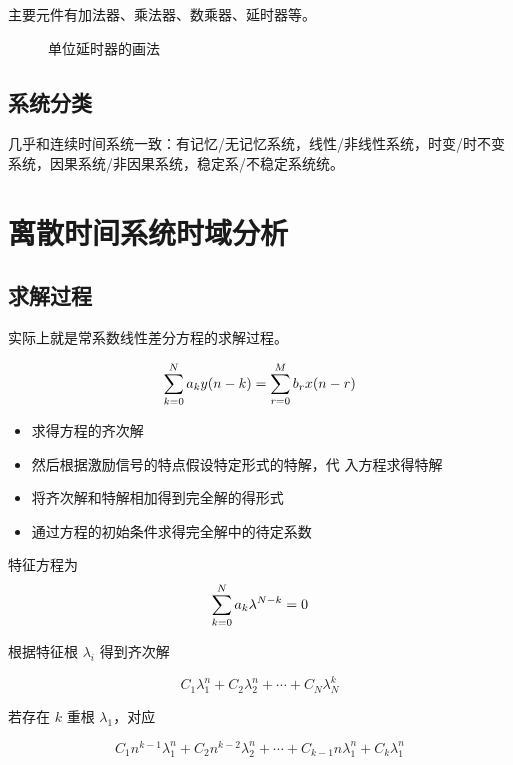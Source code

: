 \documentclass[cn,11pt,chinese,black,simple]{../elegantbook}
\begin{document}
主要元件有加法器、乘法器、数乘器、延时器等。

\begin{figure}[htb]
    \centering
    \caption{单位延时器的画法}
\end{figure}

\subsection{系统分类}

几乎和连续时间系统一致：有记忆/无记忆系统，线性/非线性系统，时变/时不变系统，因果系统/非因果系统，稳定系/不稳定系统统。

\section{离散时间系统时域分析}

\subsection{求解过程}

实际上就是常系数线性差分方程的求解过程。

\[\displaystyle\sum_{k=0}^{N} a_{k} y(n-k)=\displaystyle\sum_{r=0}^{M} b_{r} x(n-r)\]

\begin{itemize}
    \item 求得方程的齐次解
    \item 然后根据激励信号的特点假设特定形式的特解，代
    入方程求得特解
    \item 将齐次解和特解相加得到完全解的得形式
    \item 通过方程的初始条件求得完全解中的待定系数
\end{itemize}

特征方程为 \[\displaystyle\sum_{k=0}^N a_k \lambda^{N-k} = 0\] 

根据特征根 \(\lambda_i\) 得到齐次解

\[C_1 \lambda_1^n + C_2 \lambda_2^n + \cdots + C_N \lambda_N^k\]

若存在 \(k\) 重根 \(\lambda_1\)，对应 

\[C_1 n^{k-1} \lambda_1^n + C_2 n^{k-2}\lambda_2^n + \cdots + C_{k-1} n \lambda_1^n + C_k \lambda_1^n\]
\end{document}
